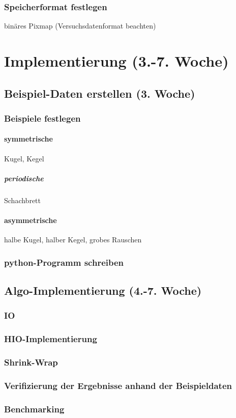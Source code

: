 \documentclass[a4paper]{article}
\begin{document}
\subsubsection{Speicherformat festlegen}
binäres Pixmap (Versuchsdatenformat beachten)
\section{Implementierung (3.-7. Woche)}
\subsection{Beispiel-Daten erstellen (3. Woche)}
\subsubsection{Beispiele festlegen}
\paragraph{symmetrische}
Kugel,
Kegel
\subparagraph{periodische}
Schachbrett
\paragraph{asymmetrische}
halbe Kugel,
halber Kegel,
grobes Rauschen
\subsubsection{python-Programm schreiben}
\subsection{Algo-Implementierung (4.-7. Woche)}
\subsubsection{IO}
\subsubsection{HIO-Implementierung}
\subsubsection{Shrink-Wrap}
\subsubsection{Verifizierung der Ergebnisse anhand der Beispieldaten}
\subsubsection{Benchmarking}
\end{document}
